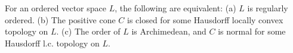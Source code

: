 For an ordered vector space $L$, the following are equivalent: (a) $L$ is regularly ordered. (b) The positive cone $C$ is closed for some Hausdorff locally convex topology on $L$. (c) The order of $L$ is Archimedean, and $C$ is normal for some Hausdorff l.c. topology on $L$.
